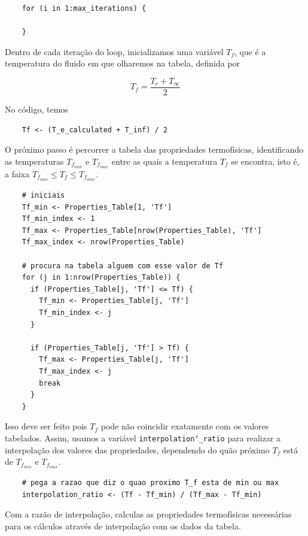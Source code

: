 \documentclass[12pt]{scrartcl}
\newcommand{\code}[1]{\texttt{#1}}
\begin{document}
\begin{lstlisting}
    for (i in 1:max_iterations) {
    
    }
\end{lstlisting}

Dentro de cada iteração do loop, inicializamos uma variável $T_f$, que é a temperatura do fluido em 
que olharemos na tabela, definida por  

\begin{equation}\label{eq:tf}
    T_f = \frac{T_e + T_{\infty}}{2}
\end{equation}

No código, temos

\begin{lstlisting}
    Tf <- (T_e_calculated + T_inf) / 2
\end{lstlisting}

O próximo passo é percorrer a tabela das propriedades termofísicas, identificando
as temperaturas $T_{f_{min}}$ e $T_{f_{max}}$ entre as quais a temperatura $T_f$ se encontra, isto é, 
a faixa $T_{f_{min}} \leq T_f \leq T_{f_{max}}$.

\begin{lstlisting}
    # iniciais
    Tf_min <- Properties_Table[1, 'Tf']
    Tf_min_index <- 1
    Tf_max <- Properties_Table[nrow(Properties_Table), 'Tf']
    Tf_max_index <- nrow(Properties_Table)
    
    # procura na tabela alguem com esse valor de Tf
    for (j in 1:nrow(Properties_Table)) {
      if (Properties_Table[j, 'Tf'] <= Tf) {
        Tf_min <- Properties_Table[j, 'Tf']
        Tf_min_index <- j
      }
      
      if (Properties_Table[j, 'Tf'] > Tf) {
        Tf_max <- Properties_Table[j, 'Tf']
        Tf_max_index <- j
        break
      }
    }
\end{lstlisting}

Isso deve ser feito pois $T_f$ pode não coincidir exatamente com os valores tabelados.
Assim, usamos a variável \code{interpolation\char`_ratio} para realizar a interpolação dos valores  
das propriedades, dependendo do quão próximo $T_f$ está de $T_{f_{min}}$ e $T_{f_{max}}$.

\begin{lstlisting}
    # pega a razao que diz o quao proximo T_f esta de min ou max
    interpolation_ratio <- (Tf - Tf_min) / (Tf_max - Tf_min)
\end{lstlisting}

Com a razão de interpolação, calculas as propriedades termofísicas necessárias para os cálculos
através de interpolação com os dados da tabela.
\end{document}
